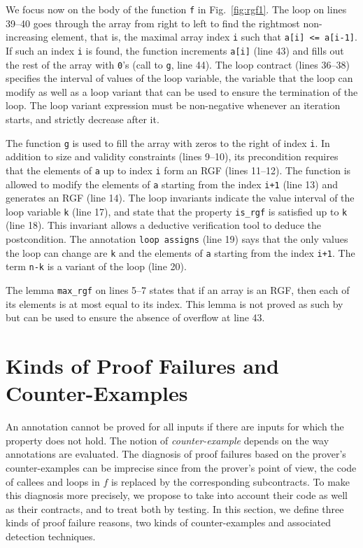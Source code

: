 We focus now on the body of the function \lstinline{f} in
Fig.~\ref{fig:rgf1}. 
The loop on lines 39--40 goes through the array from right
to left to find the rightmost non-increasing element, that is,
the maximal  array index \lstinline{i} such that \lstinline{a[i] <= a[i-1]}.
If such an index \lstinline{i} is found,
the function increments \lstinline{a[i]} (line 43) and fills out the rest
of the array with \lstinline{0}'s (call to \lstinline{g}, line 44).
The loop contract (lines 36--38) specifies the interval of values of the loop variable,
the variable that the loop can modify as well as a loop variant 
that can be used to ensure the termination of the loop.
The loop variant expression must be non-negative whenever an iteration starts,
and strictly decrease after it.

The function \lstinline{g} is used to fill the array with zeros to the right of index \lstinline{i}.
In addition to size and validity constraints (lines 9--10),
its precondition requires that the elements of \lstinline{a} up to index  \lstinline{i}
form an RGF (lines 11--12). 
The function is allowed to modify the elements of \lstinline{a} starting from the index \lstinline{i+1} (line 13)
and generates an RGF (line 14).
The loop invariants 
indicate the value interval of the loop variable \lstinline{k} (line 17), 
and state that the property \lstinline{is_rgf} is satisfied
up to \lstinline{k} (line 18).
This invariant allows a deductive verification tool to deduce the postcondition.
The annotation \lstinline{loop assigns} (line 19) says that the only values the loop can
change are \lstinline{k} and the elements of \lstinline{a} starting from the index \lstinline{i+1}.
The term \lstinline{n-k} is a variant of the loop (line 20).

The \acsl lemma \lstinline'max_rgf' on lines 5--7
states
that if an array is an RGF, then each of its elements is at most equal to its
index.
This lemma is not proved as such by \Wp but can be used to ensure the absence of
overflow at line 43.


\section{Kinds of Proof Failures and Counter-Examples}
\label{sec:ce-definitions}


An annotation
cannot be proved for all inputs if there are inputs
for which the property does not hold.
The notion of \emph{counter-example} depends on the way annotations are evaluated.
The diagnosis of proof failures 
based on the prover's counter-examples can be imprecise
since from the prover's point of view,
the code of callees and loops in $f$ is replaced by the corresponding
subcontracts.
To make this diagnosis more precisely, we propose to 
take into account their code as well as their contracts, and to treat both by testing.
In this section, we define three kinds of 
proof failure reasons, two kinds of counter-examples
and associated detection techniques.


